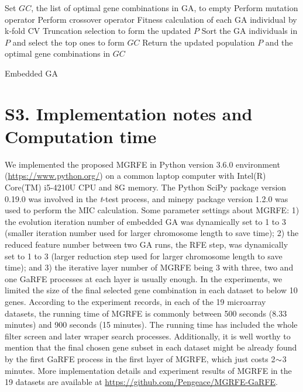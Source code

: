 \documentclass[10pt,journal,compsoc]{IEEEtran}
\begin{document}
	\begin{algorithm}
		\text{}
		Set $GC$, the list of optimal gene combinations in GA, to empty\;
		{
			Perform mutation operator\;
			Perform crossover operator\;
			Fitness calculation of each GA individual by k-fold CV\;
			Truncation selection to form the updated $P$\;
		}
		Sort the GA individuals in $P$ and select the top ones to form $GC$\;
		Return the updated population $P$ and the optimal gene combinations in $GC$\;
		\caption{Embedded GA}\label{Algo:GA}
	\end{algorithm}
	
	
	\section*{S3. Implementation notes and Computation time}

	We implemented the proposed MGRFE in Python version 3.6.0 environment (\url{https://www.python.org/}) on a common laptop computer with Intel(R) Core(TM) i5-4210U CPU and 8G memory. The Python SciPy package version 0.19.0 \cite{RN441} was involved in the \textit{t}-test process, and minepy package version 1.2.0 \cite{RN440} was used to perform the MIC calculation. Some parameter settings about MGRFE: 1) the evolution iteration number of embedded GA was dynamically set to 1 to 3 (smaller iteration number used for larger chromosome length to save time); 2) the reduced feature number between two GA runs, the RFE step, was dynamically set to 1 to 3 (larger reduction step used for larger chromosome length to save time); and 3) the iterative layer number of MGRFE being 3 with three, two and one GaRFE processes at each layer is usually enough. In the experiments, we limited the size of the final selected gene combination in each dataset to below 10 genes. According to the experiment records, in each of the 19 microarray datasets, the running time of MGRFE is commonly between 500 seconds (8.33 minutes) and 900 seconds (15 minutes). The running time has included the whole filter screen and later wraper search processes. Additionally, it is well worthy to mention that the final chosen gene subset in each dataset might be already found by the first GaRFE process in the first layer of MGRFE, which just costs 2\(\scriptsize{\sim}\)3 minutes. More implementation details and experiment results of MGRFE in the 19 datasets are available at \url{https://github.com/Pengeace/MGRFE-GaRFE}.
	
\end{document}

